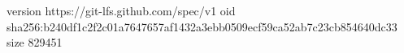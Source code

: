 version https://git-lfs.github.com/spec/v1
oid sha256:b240df1c2f2c01a7647657af1432a3ebb0509ecf59ca52ab7c23cb854640dc33
size 829451

